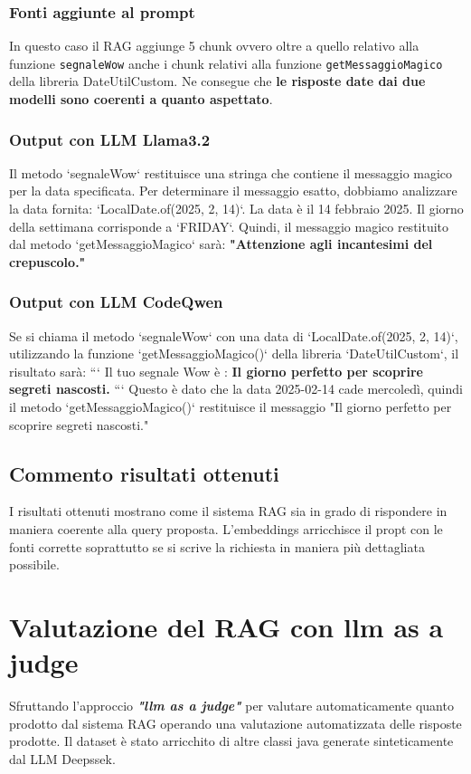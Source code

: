 \documentclass[12pt,a4paper,openright,twoside]{book}
\begin{document}
\subsubsection{Fonti aggiunte al prompt}
In questo caso il RAG aggiunge 5 chunk ovvero oltre a quello relativo alla funzione \texttt{segnaleWow} anche i chunk relativi alla funzione \texttt{getMessaggioMagico} della libreria DateUtilCustom.
Ne consegue che \textbf{le risposte date dai due modelli sono coerenti a quanto aspettato}.
\subsubsection{Output con LLM Llama3.2}
Il metodo `segnaleWow` restituisce una stringa che contiene il messaggio magico per la data specificata. 
Per determinare il messaggio esatto, dobbiamo analizzare la data fornita: `LocalDate.of(2025, 2, 14)`.
La data è il 14 febbraio 2025. Il giorno della settimana corrisponde a `FRIDAY`.
Quindi, il messaggio magico restituito dal metodo `getMessaggioMagico` sarà:
\textbf{"Attenzione agli incantesimi del crepuscolo."}
\subsubsection{Output con LLM CodeQwen}
Se si chiama il metodo `segnaleWow` con una data di `LocalDate.of(2025, 2, 14)`, utilizzando la funzione `getMessaggioMagico()` della libreria `DateUtilCustom`, il risultato sarà:
```
Il tuo segnale Wow è : \textbf{Il giorno perfetto per scoprire segreti nascosti.}
```
Questo è dato che la data 2025-02-14 cade mercoledì, quindi il metodo `getMessaggioMagico()` restituisce il messaggio "Il giorno perfetto per scoprire segreti nascosti."
\subsection{Commento risultati ottenuti}
I risultati ottenuti mostrano come il sistema RAG sia in grado di rispondere in maniera coerente alla query proposta.
L'embeddings arricchisce il propt con le fonti corrette soprattutto se si scrive la richiesta in maniera più dettagliata possibile.

\section{Valutazione del RAG con llm as a judge}
Sfruttando l'approccio \textbf{\emph{"llm as a judge"}} per valutare automaticamente quanto prodotto dal sistema RAG
operando una valutazione automatizzata delle risposte prodotte.
Il dataset è stato arricchito di altre classi java generate sinteticamente dal LLM Deepssek.
\end{document}
